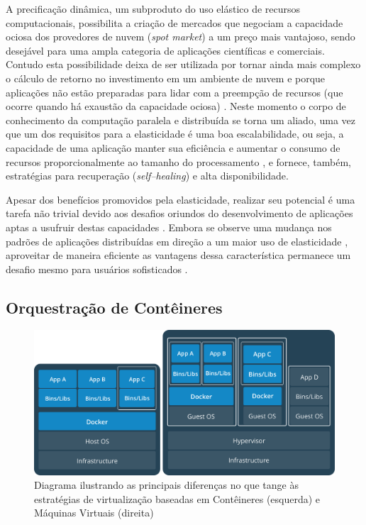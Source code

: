 \documentclass[english,brazilian]{UNISINOSmonografia} %
\newcommand\defaultFigureWidth{0.9}
\begin{document}
A precificação dinâmica, um subproduto do uso elástico de recursos computacionais, possibilita a criação de mercados que negociam a capacidade ociosa dos provedores de nuvem (\textit{spot market}) a um preço mais vantajoso, sendo desejável para uma ampla categoria de aplicações científicas e comerciais.
Contudo esta possibilidade deixa de ser utilizada por tornar ainda mais complexo o cálculo de retorno no investimento em um ambiente de nuvem e porque aplicações não estão preparadas para lidar com a preempção de recursos (que ocorre quando há exaustão da capacidade ociosa) \cite{Jonas2017}.
Neste momento o corpo de conhecimento da computação paralela e distribuída se torna um aliado, uma vez que um dos requisitos para a elasticidade é uma boa escalabilidade, ou seja, a capacidade de uma aplicação manter sua eficiência e aumentar o consumo de recursos proporcionalmente ao tamanho do processamento \cite{Galante2012,HennessyPatterson2013}, e fornece, também, estratégias para recuperação (\textit{self--healing}) e alta disponibilidade.


Apesar dos benefícios promovidos pela elasticidade, realizar seu potencial é uma tarefa não trivial devido aos desafios oriundos do desenvolvimento de aplicações aptas a usufruir destas capacidades \cite{Raveendran2011,Loff2014}.
Embora se observe uma mudança nos padrões de aplicações distribuídas em direção a um maior uso de elasticidade \cite{Shankar2018}, aproveitar de maneira eficiente as vantagens dessa característica permanece um desafio mesmo para usuários sofisticados \cite{Jonas2017}.


\subsection{Orquestração de Contêineres}


\begin{figure}[tb]
	\centering%
	\begin{minipage}{\defaultFigureWidth\textwidth}
		\caption[Diagrama ilustrando as principais diferenças no que tange às estratégias de virtualização baseadas em Contêineres e Máquinas Virtuais]{Diagrama ilustrando as principais diferenças no que tange às estratégias de virtualização baseadas em Contêineres (esquerda) e Máquinas Virtuais (direita)}
		\label{fig:docker}
		\vspace{1ex}
		\includegraphics[clip,width=\textwidth]{docker-concept}
	\end{minipage}
\end{figure}
\end{document}
